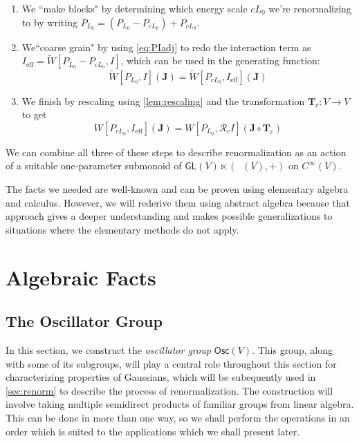 \documentclass[12pt]{article}
\theoremstyle{definition}
\theoremstyle{plain}
\newcommand{\Symp}{\mathop{\mathrm{Sym}_2^+}}
\begin{document}
\begin{enumerate}
    \item We ``make blocks" by determining which energy scale $cL_0$ we're renormalizing to by writing \( P_{L_0} = (P_{L_0} - P_{cL_0}) + P_{cL_0} \).  
    \item We``coarse grain" by using \autoref{eq:PIadj} to redo the interaction term as $I_{\text{eff}} = \tilde{W}[P_{L_0}-P_{cL_0},I]$, which can be used in the generating function:
    \begin{equation}
        \tilde{W}[P_{L_0},I](\mathbf{J}) = \tilde{W}[P_{c L_0},I_{\text{eff}}](\mathbf{J})
    \end{equation}
    \item We finish by rescaling using \autoref{lem:rescaling} and the transformation $\mathbf{T}_c:V\to V$ to get
    \begin{equation}
        W[P_{c L_0},I_{\text{eff}}](\mathbf{J}) = W[P_{L_0},\mathcal{R}_{c} I](\mathbf{J}\circ \mathbf{T}_c)
    \end{equation}
\end{enumerate}

We can combine all three of these steps to 
describe renormalization as an action of a suitable one-parameter submonoid of \(\mathsf{GL} (V) \ltimes (\Symp (V), +)\) on \(C^{\infty} (V)\).  
 
The facts we needed are well-known and can be proven using elementary algebra and calculus.  However, we will rederive them using abstract algebra because that approach gives a deeper understanding and makes possible generalizations to situations where the elementary methods do not apply.  
 
\section{Algebraic Facts} \label{Alg}

\subsection{The Oscillator Group} \label{sec:oscgroup}

In this section, we construct the \emph{oscillator group} \(\mathsf{Osc} (V)\).
This group, along with some of its subgroups, will play a central role throughout this section for characterizing properties of Gaussians, which will be subequently used in \autoref{sec:renorm} to describe the process of renormalization.
The construction will involve taking multiple semidirect products of familiar groups from linear algebra. This can be done in more than one way, so we shall perform the operations in an order which is suited to the applications which we shall present later.
\end{document}
